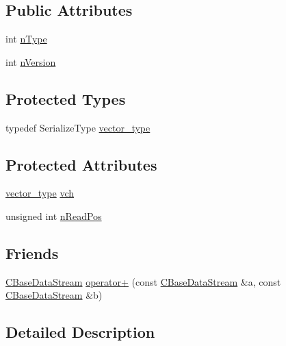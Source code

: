 \subsection*{Public Attributes}
\begin{DoxyCompactItemize}
\item 
int \mbox{\hyperlink{class_c_base_data_stream_acd93d8bc03d65130819f2ff79be43234}{n\+Type}}
\item 
int \mbox{\hyperlink{class_c_base_data_stream_a9a6ab5bb4c659f3ee03dca351c9de88e}{n\+Version}}
\end{DoxyCompactItemize}
\subsection*{Protected Types}
\begin{DoxyCompactItemize}
\item 
typedef Serialize\+Type \mbox{\hyperlink{class_c_base_data_stream_a035e97a3e024a8cfa4690eaca1e5e290}{vector\+\_\+type}}
\end{DoxyCompactItemize}
\subsection*{Protected Attributes}
\begin{DoxyCompactItemize}
\item 
\mbox{\hyperlink{class_c_base_data_stream_a035e97a3e024a8cfa4690eaca1e5e290}{vector\+\_\+type}} \mbox{\hyperlink{class_c_base_data_stream_a2316d80610702632a74252c4db156990}{vch}}
\item 
unsigned int \mbox{\hyperlink{class_c_base_data_stream_abcabb286ff13fbe8819e7713d06f8d58}{n\+Read\+Pos}}
\end{DoxyCompactItemize}
\subsection*{Friends}
\begin{DoxyCompactItemize}
\item 
\mbox{\hyperlink{class_c_base_data_stream}{C\+Base\+Data\+Stream}} \mbox{\hyperlink{class_c_base_data_stream_af7942137a7d02a674bc7bedb0190cb1d}{operator+}} (const \mbox{\hyperlink{class_c_base_data_stream}{C\+Base\+Data\+Stream}} \&a, const \mbox{\hyperlink{class_c_base_data_stream}{C\+Base\+Data\+Stream}} \&b)
\end{DoxyCompactItemize}


\subsection{Detailed Description}
